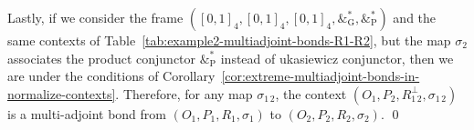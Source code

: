 \documentclass[runningheads,a4paper]{llncs}
\newcommand{\M}{\mathbb{M}}
\newcommand{\adjoint}{\mathop{\&}\nolimits}
\newcommand{\G}{\text{G}}
\renewcommand{\P}{\text{P}}
\let\oldLcommand\L
\let\L\relax
\def\L{\text{\oldLcommand}}
\begin{document}
\begin{example}
Lastly, if we consider the frame $([0, 1]_4, [0, 1]_4, [0, 1]_4, \adjoint^*_\G, \adjoint^*_\P)$ and
the same contexts of Table~\ref{tab:example2-multiadjoint-bonds-R1-R2}, but the map $\sigma_2$ associates the product conjunctor $\adjoint^*_\P$ instead of \L ukasiewicz conjunctor, then we are under the conditions of Corollary~\ref{cor:extreme-multiadjoint-bonds-in-normalize-contexts}. Therefore, for any map $\sigma_{1\,2}$, the context $(O_1, P_2, R_{1\,2}^\bot, \sigma_{1\,2})$ is a multi-adjoint bond from $(O_1, P_1, R_1, \sigma_1)$ to $(O_2, P_2, R_2, \sigma_2)$. \qed

\end{example}

	
\end{document}
